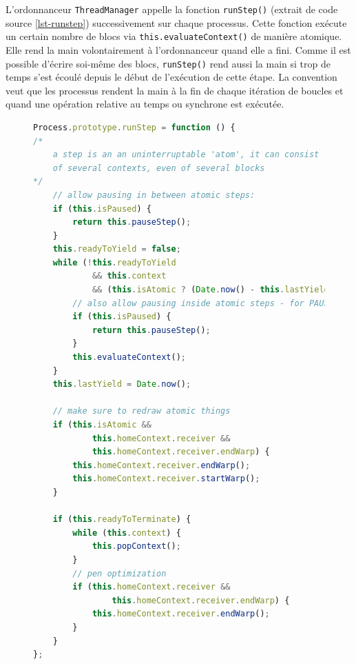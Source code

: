 L'ordonnanceur \texttt{ThreadManager} appelle la fonction \texttt{runStep()} (extrait de code source \ref{lst-runstep}) successivement sur chaque processus. Cette fonction exécute un certain nombre de blocs via \texttt{this.evaluateContext()} de manière atomique. Elle rend la main volontairement à l'ordonnanceur quand elle a fini. Comme il est possible d'écrire soi-même des blocs, \texttt{runStep()} rend aussi la main si trop de temps s'est écoulé depuis le début de l'exécution de cette étape. La convention veut que les processus rendent la main à la fin de chaque itération de boucles et quand une opération relative au temps ou synchrone est exécutée.
\begin{figure}
\begin{lstlisting}[caption={Fonction \texttt{runStep()} de \texttt{Process}},label=lst-runstep,language=JavaScript]
Process.prototype.runStep = function () {
/*
    a step is an an uninterruptable 'atom', it can consist
    of several contexts, even of several blocks
*/
    // allow pausing in between atomic steps:
    if (this.isPaused) {
        return this.pauseStep();
    }
    this.readyToYield = false;
    while (!this.readyToYield
            && this.context
            && (this.isAtomic ? (Date.now() - this.lastYield < this.timeout) : true) ) {
        // also allow pausing inside atomic steps - for PAUSE block primitive:
        if (this.isPaused) {
            return this.pauseStep();
        }
        this.evaluateContext();
    }
    this.lastYield = Date.now();

    // make sure to redraw atomic things
    if (this.isAtomic &&
            this.homeContext.receiver &&
            this.homeContext.receiver.endWarp) {
        this.homeContext.receiver.endWarp();
        this.homeContext.receiver.startWarp();
    }

    if (this.readyToTerminate) {
        while (this.context) {
            this.popContext();
        }
        // pen optimization
        if (this.homeContext.receiver &&
                this.homeContext.receiver.endWarp) {
            this.homeContext.receiver.endWarp();
        }
    }
};
\end{lstlisting}
\end{figure}


